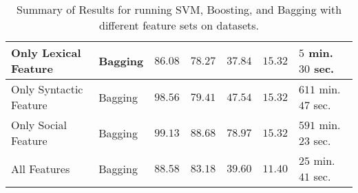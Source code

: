 \begin{table*}[htb]
{\begin{tabular}{|@{~}l@{~~}|@{~~}l@{~}|@{~~}l@{~}|@{~~}l@{~}|@{~~}l@{~}|@{~~}l@{~}|@{~~}l@{~}|}
Only Lexical Feature & Bagging & $86.08$ & $78.27$ & $37.84$ & $15.32$ & $5$ min. $30$ sec. \\\hline
Only Syntactic Feature & Bagging & $98.56$ & $79.41$ & $47.54$ & $15.32$ & $611$ min. $47$ sec.\\\hline
Only Social Feature & Bagging & $99.13$ & $88.68$ & $78.97$ & $15.32$ & $591$ min. $23$ sec. \\\hline
All Features & Bagging & $88.58$ & $83.18$ & $39.60$ & $11.40$ & $25$ min. $41$ sec. \\\hline
\end{tabular}
  }
 \vspace{0.05in}
  \caption{Summary of Results for running SVM, Boosting, and Bagging with different feature sets on datasets.}
  \label{tab:data1}
\end{table*}
